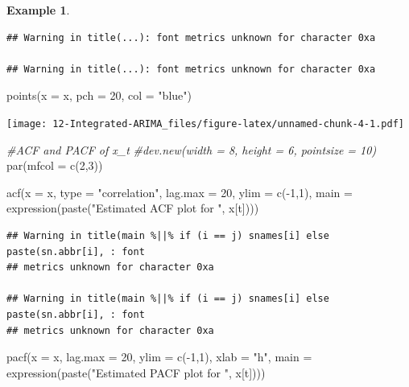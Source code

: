 \documentclass[
]{book}
\newenvironment{Shaded}{\begin{snugshade}}{\end{snugshade}}
\newcommand{\AttributeTok}[1]{\textcolor[rgb]{0.77,0.63,0.00}{#1}}
\newcommand{\CommentTok}[1]{\textcolor[rgb]{0.56,0.35,0.01}{\textit{#1}}}
\newcommand{\DecValTok}[1]{\textcolor[rgb]{0.00,0.00,0.81}{#1}}
\newcommand{\FunctionTok}[1]{\textcolor[rgb]{0.00,0.00,0.00}{#1}}
\newcommand{\NormalTok}[1]{#1}
\newcommand{\SpecialCharTok}[1]{\textcolor[rgb]{0.00,0.00,0.00}{#1}}
\newcommand{\StringTok}[1]{\textcolor[rgb]{0.31,0.60,0.02}{#1}}
\theoremstyle{definition}
\theoremstyle{definition}
\newtheorem{example}{Example}[chapter]
\theoremstyle{definition}
\theoremstyle{definition}
\theoremstyle{remark}
\begin{document}
\begin{example}
\begin{verbatim}
## Warning in title(...): font metrics unknown for character 0xa

## Warning in title(...): font metrics unknown for character 0xa
\end{verbatim}

\begin{Shaded}
\begin{Highlighting}[]
\FunctionTok{points}\NormalTok{(}\AttributeTok{x =}\NormalTok{ x, }\AttributeTok{pch =} \DecValTok{20}\NormalTok{, }\AttributeTok{col =} \StringTok{"blue"}\NormalTok{)}
\end{Highlighting}
\end{Shaded}

\texttt{[image: 12-Integrated-ARIMA\_files/figure-latex/unnamed-chunk-4-1.pdf]}

\begin{Shaded}
\begin{Highlighting}[]
\CommentTok{\#ACF and PACF of x\_t}
\CommentTok{\#dev.new(width = 8, height = 6, pointsize = 10)}
\FunctionTok{par}\NormalTok{(}\AttributeTok{mfcol =} \FunctionTok{c}\NormalTok{(}\DecValTok{2}\NormalTok{,}\DecValTok{3}\NormalTok{))}

\FunctionTok{acf}\NormalTok{(}\AttributeTok{x =}\NormalTok{ x, }\AttributeTok{type =} \StringTok{"correlation"}\NormalTok{, }\AttributeTok{lag.max =} \DecValTok{20}\NormalTok{, }\AttributeTok{ylim =} 
     \FunctionTok{c}\NormalTok{(}\SpecialCharTok{{-}}\DecValTok{1}\NormalTok{,}\DecValTok{1}\NormalTok{), }\AttributeTok{main =} \FunctionTok{expression}\NormalTok{(}\FunctionTok{paste}\NormalTok{(}\StringTok{"Estimated ACF plot }
\StringTok{     for "}\NormalTok{, x[t])))}
\end{Highlighting}
\end{Shaded}

\begin{verbatim}
## Warning in title(main %||% if (i == j) snames[i] else paste(sn.abbr[i], : font
## metrics unknown for character 0xa

## Warning in title(main %||% if (i == j) snames[i] else paste(sn.abbr[i], : font
## metrics unknown for character 0xa
\end{verbatim}

\begin{Shaded}
\begin{Highlighting}[]
\FunctionTok{pacf}\NormalTok{(}\AttributeTok{x =}\NormalTok{ x, }\AttributeTok{lag.max =} \DecValTok{20}\NormalTok{, }\AttributeTok{ylim =} \FunctionTok{c}\NormalTok{(}\SpecialCharTok{{-}}\DecValTok{1}\NormalTok{,}\DecValTok{1}\NormalTok{), }\AttributeTok{xlab =} \StringTok{"h"}\NormalTok{, }
     \AttributeTok{main =} \FunctionTok{expression}\NormalTok{(}\FunctionTok{paste}\NormalTok{(}\StringTok{"Estimated PACF plot for "}\NormalTok{, }
\NormalTok{      x[t])))}
 

\end{Highlighting}
\end{Shaded}
\end{example}
\end{document}
